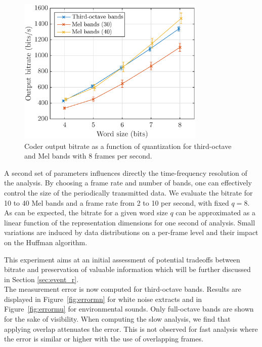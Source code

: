 \documentclass[sensors,article,submit,moreauthors,pdftex,10pt,a4paper]{mdpi}
\begin{document}
\begin{figure}[htbp]
	\centering
		\includegraphics[width=0.8\textwidth]{figures/bitrate_qall.eps}
	\caption{Coder output bitrate as a function of quantization for third-octave and Mel bands with 8 frames per second.}
	\label{fig:bitrate_q}
\end{figure}

A second set of parameters influences directly the time-frequency resolution of the analysis. By choosing a frame rate and number of bands, one can effectively control the size of the periodically transmitted data. We evaluate the bitrate for 10 to 40 Mel bands and a frame rate from 2 to 10 per second, with fixed $q = 8$. As can be expected, the bitrate for a given word size $q$ can be approximated as a linear function of the representation dimensions for one second of analysis. Small variations are induced by data distributions on a per-frame level and their impact on the Huffman algorithm.

This experiment aims at an initial assessment of potential tradeoffs between bitrate and preservation of valuable information which will be further discussed in Section \ref{sec:event_r}.\\

The measurement error is now computed for third-octave bands. Results are displayed in Figure~\ref{fig:errormn} for white noise extracts and in Figure~\ref{fig:errormu} for environmental sounds. Only full-octave bands are shown for the sake of visibility. When computing the slow analysis, we find that applying overlap attenuates the error. This is not observed for fast analysis where the error is similar or higher with the use of overlapping frames.
\end{document}

